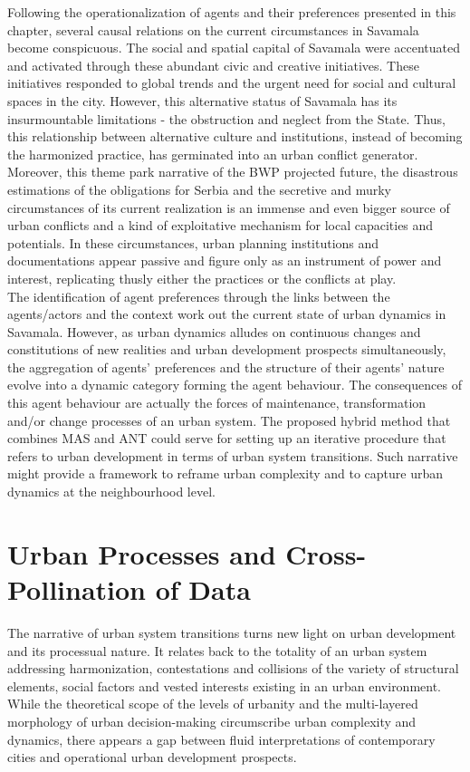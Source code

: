 \documentclass[11pt]{report}
\begin{document}
Following the operationalization of agents and their preferences presented in this chapter, several causal relations on the current circumstances in Savamala become conspicuous.
The social and spatial capital of Savamala were accentuated and activated through these abundant civic and creative initiatives.
These initiatives responded to global trends and the urgent need for social and cultural spaces in the city.
However, this alternative status of Savamala has its insurmountable limitations - the obstruction and neglect from the State.
Thus, this relationship between alternative culture and institutions, instead of becoming the harmonized practice, has germinated into an urban conflict generator.
\\

Moreover, this theme park narrative of the BWP projected future, the disastrous estimations of the obligations for Serbia and the secretive and murky circumstances of its current realization is an immense and even bigger source of urban conflicts and a kind of exploitative mechanism for local capacities and potentials.
In these circumstances, urban planning institutions and documentations appear passive and figure only as an instrument of power and interest, replicating thusly either the practices or the conflicts at play.
\\

The identification of agent preferences through the links between the agents/actors and the context work out the current state of urban dynamics in Savamala.
However, as urban dynamics alludes on continuous changes and constitutions of new realities and urban development prospects simultaneously, the aggregation of agents' preferences and the structure of their agents' nature evolve into a dynamic category forming the agent behaviour.
The consequences of this agent behaviour are actually the forces of maintenance, transformation and/or change processes of an urban system.
The proposed hybrid method that combines MAS and ANT could serve for setting up an iterative procedure that refers to urban development in terms of urban system transitions.
Such narrative might provide a framework to reframe urban complexity and to capture urban dynamics at the neighbourhood level.

\chapter{Urban Processes and Cross-Pollination of Data}

The narrative of urban system transitions turns new light on urban development and its processual nature. It relates back to the totality of an urban system addressing harmonization, contestations and collisions of the variety of structural elements, social factors and vested interests existing in an urban environment.
While the theoretical scope of the levels of urbanity and the multi-layered morphology of urban decision-making circumscribe urban complexity and dynamics, there appears a gap between fluid interpretations of contemporary cities and operational urban development prospects.
\\
\end{document}
